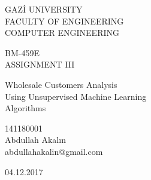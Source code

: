 \begin{titlepage}
    \begin{center}
        \begin{large}
            \vspace*{0.5cm}
            GAZ\.{I} UNIVERSITY \\
            FACULTY OF ENGINEERING \\ 
            COMPUTER ENGINEERING

            \vfill
            BM-459E \\
            ASSIGNMENT III

            \vfill
            Wholesale Customers Analysis \\
            Using Unsupervised Machine Learning \\
            Algorithms

            \vfill
            141180001\\Abdullah Akalın\\abdullahakalin@gmail.com

            \vfill
            \vspace{0.5cm}
            04.12.2017
        \end{large}
    \end{center}
\end{titlepage}
